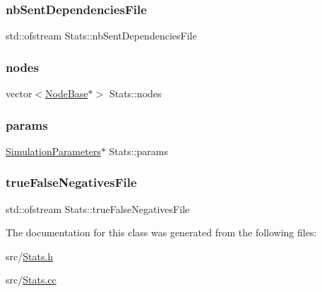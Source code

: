 \mbox{\label{classStats_a26404a5110226c52970e3c261c6d8126}} 
\subsubsection{\texorpdfstring{nb\+Sent\+Dependencies\+File}{nbSentDependenciesFile}}
{\footnotesize\ttfamily std\+::ofstream Stats\+::nb\+Sent\+Dependencies\+File\hspace{0.3cm}{\ttfamily [private]}}

\mbox{\label{classStats_a815a3aa12c1529fe3d686038a2094fb2}} 
\subsubsection{\texorpdfstring{nodes}{nodes}}
{\footnotesize\ttfamily vector$<$\hyperlink{classNodeBase}{Node\+Base}$\ast$$>$ Stats\+::nodes\hspace{0.3cm}{\ttfamily [private]}}

\mbox{\label{classStats_aec7570f722a5a0c6ed5f6b7208331dc1}} 
\subsubsection{\texorpdfstring{params}{params}}
{\footnotesize\ttfamily \hyperlink{classSimulationParameters}{Simulation\+Parameters}$\ast$ Stats\+::params\hspace{0.3cm}{\ttfamily [private]}}

\mbox{\label{classStats_ac9e180c84874fabd361396f3c9a166ae}} 
\subsubsection{\texorpdfstring{true\+False\+Negatives\+File}{trueFalseNegativesFile}}
{\footnotesize\ttfamily std\+::ofstream Stats\+::true\+False\+Negatives\+File\hspace{0.3cm}{\ttfamily [private]}}



The documentation for this class was generated from the following files\+:\begin{DoxyCompactItemize}
\item 
src/\hyperlink{Stats_8h}{Stats.\+h}\item 
src/\hyperlink{Stats_8cc}{Stats.\+cc}\end{DoxyCompactItemize}
